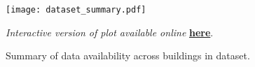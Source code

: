 \begin{figure}
    \centering
    \texttt{[image: dataset\_summary.pdf]}
    \vspace*{-1cm}
    \caption{Summary of data availability across buildings in dataset.} \label{fig:estates-data-summary}
    \vspace{0.2cm}
    \footnotesize{\textit{Interactive version of plot available online} \href{https://eeci.github.io/Cambridge-Estates-Building-Energy-Archive/building_data_summary.html}{\textbf{here}}.}
\end{figure}